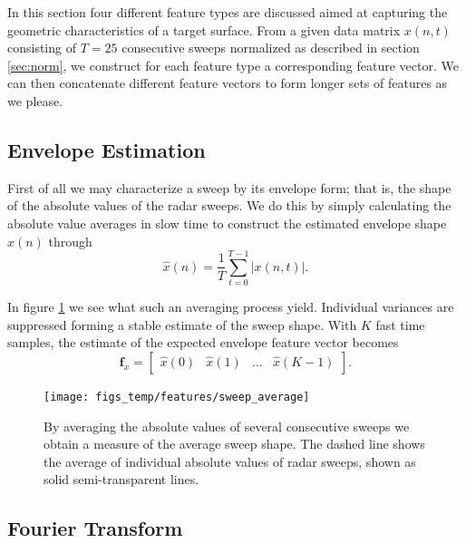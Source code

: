 In this section four different feature types are discussed aimed at capturing the geometric characteristics of a target surface. From a given data matrix $x(n,t)$ consisting of $T=25$ consecutive sweeps normalized as described in section \ref{sec:norm}, we construct for each feature type a corresponding feature vector. We can then concatenate different feature vectors to form longer sets of features as we please.  

\subsection{Envelope Estimation}

First of all we may characterize a sweep by its envelope form; that is, the shape of the absolute values of the radar sweeps. We do this by simply calculating the absolute value averages in slow time to construct the estimated envelope shape $\hat{x}(n)$ through
\begin{equation}
	\hat{x}(n) = \frac{1}{T}\sum_{t=0}^{T-1}|x(n, t)|.
\end{equation}

In figure \ref{fig:sweep_average} we see what such an averaging process yield. Individual variances are suppressed forming a stable estimate of the sweep shape. With $K$ fast time samples, the estimate of the expected envelope feature vector becomes 
\begin{equation}
	\mathbf{f}_{x} = 
	\begin{bmatrix}
		\hat{x}(0) & \hat{x}(1) & ... & \hat{x}(K-1)
	\end{bmatrix}.
\end{equation}

\begin{figure}[h]
	\centering
	\texttt{[image: figs\_temp/features/sweep\_average]}
	\caption{By averaging the absolute values of several consecutive sweeps we obtain a measure of the average sweep shape. The dashed line shows the average of individual absolute values of radar sweeps, shown as solid semi-transparent lines.}
	\label{fig:sweep_average}
\end{figure}


\subsection{Fourier Transform}

